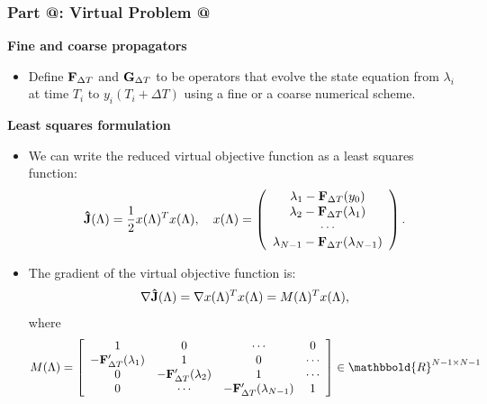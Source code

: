 \documentclass[9pt]{beamer}
\makeatletter
\newcommand*{\rom}[1]{\expandafter\@slowromancap\romannumeral #1@}
\makeatother
\begin{document}
\begin{frame}
\frametitle{\textbf{ Part \rom{3}:} Virtual Problem \rom{1}}
\textbf{Fine and coarse propagators}
\begin{itemize}
\item{Define $\bold{F}_{\Delta T}$ and $\bold{G}_{\Delta T}$ to be operators that evolve the state equation from $\lambda_i$ at time $T_{i}$ to $y_i(T_{i}+\Delta T)$ using a fine or a coarse numerical scheme. }
\end{itemize}
\textbf{Least squares formulation}
\begin{itemize}
\item{We can write the reduced virtual objective function as a least squares function:
{\small
\begin{align*}
\bold{ \hat J}(\Lambda) = \frac{1}{2} x(\Lambda)^Tx(\Lambda),\quad
x(\Lambda)=\left( \begin{array}{c}  
   \lambda_1 - \bold F_{\Delta T}(y_0) \\ 
   \lambda_2 - \bold F_{\Delta T}(\lambda_1) \\
   \cdots  \\
   \lambda_{N-1} -\bold F_{\Delta T}(\lambda_{N-1}) \\
   \end{array}  \right).
\end{align*}}}
\item{The gradient of the virtual objective function is:
{\small
\begin{align*}
\nabla \bold{\hat J}(\Lambda)= \nabla x(\Lambda)^T x(\Lambda) = M(\Lambda)^Tx(\Lambda),
\end{align*}}
where 
{\small
\begin{align*}
M(\Lambda)= \left[ \begin{array}{cccc}
   1 & 0 & \cdots & 0 \\  
   -\bold{F}_{\Delta T}'(\lambda_{1}) & 1 & 0 & \cdots \\ 
   0 &-\bold{F}_{\Delta T}'(\lambda_{2}) & 1  & \cdots \\
   0 &\cdots &-\bold{F}_{\Delta T}'(\lambda_{N-1}) & 1  \\
   \end{array}  \right]\in\mathbbold{R}^{N-1\times N-1}
\end{align*}}}
\end{itemize}
\end{frame}
\end{document}
